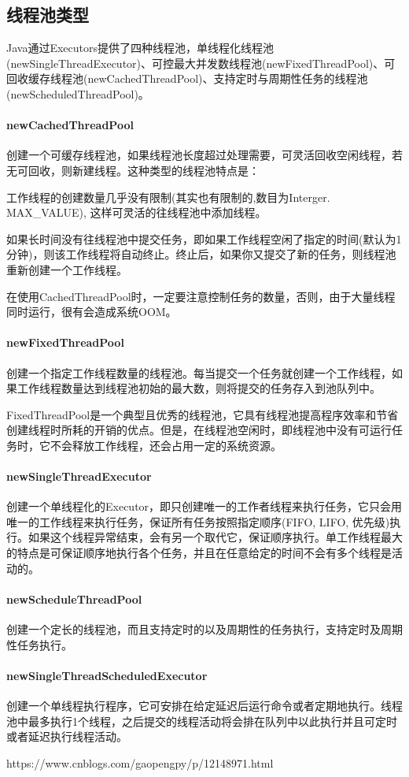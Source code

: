 \documentclass[../../../interview-questions.tex]{subfiles}
\begin{document}
\subsection{线程池类型}

Java通过Executors提供了四种线程池，单线程化线程池(newSingleThreadExecutor)、可控最大并发数线程池(newFixedThreadPool)、可回收缓存线程池(newCachedThreadPool)、支持定时与周期性任务的线程池(newScheduledThreadPool)。

\paragraph{newCachedThreadPool}

创建一个可缓存线程池，如果线程池长度超过处理需要，可灵活回收空闲线程，若无可回收，则新建线程。这种类型的线程池特点是：

工作线程的创建数量几乎没有限制(其实也有限制的,数目为Interger. MAX\_VALUE), 这样可灵活的往线程池中添加线程。

如果长时间没有往线程池中提交任务，即如果工作线程空闲了指定的时间(默认为1分钟)，则该工作线程将自动终止。终止后，如果你又提交了新的任务，则线程池重新创建一个工作线程。

在使用CachedThreadPool时，一定要注意控制任务的数量，否则，由于大量线程同时运行，很有会造成系统OOM。

\paragraph{newFixedThreadPool}

创建一个指定工作线程数量的线程池。每当提交一个任务就创建一个工作线程，如果工作线程数量达到线程池初始的最大数，则将提交的任务存入到池队列中。

FixedThreadPool是一个典型且优秀的线程池，它具有线程池提高程序效率和节省创建线程时所耗的开销的优点。但是，在线程池空闲时，即线程池中没有可运行任务时，它不会释放工作线程，还会占用一定的系统资源。

\paragraph{newSingleThreadExecutor}

创建一个单线程化的Executor，即只创建唯一的工作者线程来执行任务，它只会用唯一的工作线程来执行任务，保证所有任务按照指定顺序(FIFO, LIFO, 优先级)执行。如果这个线程异常结束，会有另一个取代它，保证顺序执行。单工作线程最大的特点是可保证顺序地执行各个任务，并且在任意给定的时间不会有多个线程是活动的。

\paragraph{newScheduleThreadPool}

创建一个定长的线程池，而且支持定时的以及周期性的任务执行，支持定时及周期性任务执行。

\paragraph{newSingleThreadScheduledExecutor}

创建一个单线程执行程序，它可安排在给定延迟后运行命令或者定期地执行。线程池中最多执行1个线程，之后提交的线程活动将会排在队列中以此执行并且可定时或者延迟执行线程活动。

https://www.cnblogs.com/gaopengpy/p/12148971.html
\end{document}
